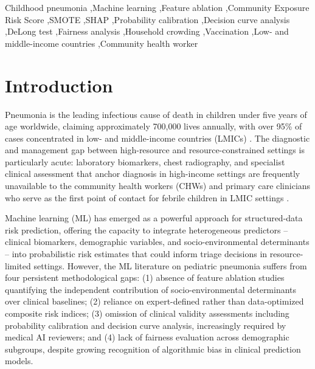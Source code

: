 \documentclass[3p,times,twocolumn]{elsarticle}
\begin{document}
\begin{frontmatter}
\begin{keyword}
Childhood pneumonia \sep Machine learning \sep Feature ablation \sep Community Exposure Risk Score \sep SMOTE \sep SHAP \sep Probability calibration \sep Decision curve analysis \sep DeLong test \sep Fairness analysis \sep Household crowding \sep Vaccination \sep Low- and middle-income countries \sep Community health worker
\end{keyword}

\end{frontmatter}

\section{Introduction}
Pneumonia is the leading infectious cause of death in children under five years of age worldwide, claiming approximately 700{,}000 lives annually, with over 95\% of cases concentrated in low- and middle-income countries (LMICs) \cite{ref1,ref2,ref3,ref4}. The diagnostic and management gap between high-resource and resource-constrained settings is particularly acute: laboratory biomarkers, chest radiography, and specialist clinical assessment that anchor diagnosis in high-income settings are frequently unavailable to the community health workers (CHWs) and primary care clinicians who serve as the first point of contact for febrile children in LMIC settings \cite{ref10,ref12}.

Machine learning (ML) has emerged as a powerful approach for structured-data risk prediction, offering the capacity to integrate heterogeneous predictors -- clinical biomarkers, demographic variables, and socio-environmental determinants -- into probabilistic risk estimates that could inform triage decisions in resource-limited settings. However, the ML literature on pediatric pneumonia suffers from four persistent methodological gaps: (1) absence of feature ablation studies quantifying the independent contribution of socio-environmental determinants over clinical baselines; (2) reliance on expert-defined rather than data-optimized composite risk indices; (3) omission of clinical validity assessments including probability calibration and decision curve analysis, increasingly required by medical AI reviewers; and (4) lack of fairness evaluation across demographic subgroups, despite growing recognition of algorithmic bias in clinical prediction models.
\end{document}
